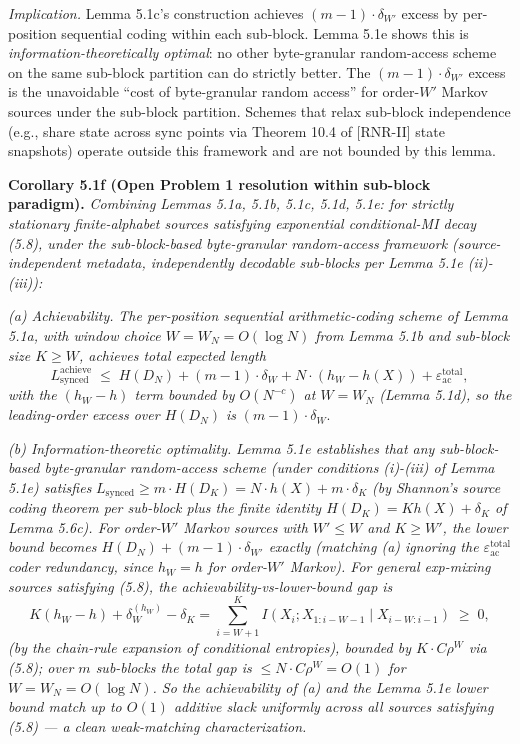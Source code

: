 \documentclass[
]{article}
\begin{document}
\emph{Implication.} Lemma 5.1c's construction achieves
$(m-1) \cdot \delta_{W'}$ excess by per-position sequential coding
within each sub-block. Lemma 5.1e shows this is
\emph{information-theoretically optimal}: no other byte-granular
random-access scheme on the same sub-block partition can do strictly
better. The $(m-1) \cdot \delta_{W'}$ excess is the unavoidable
``cost of byte-granular random access'' for order-$W'$ Markov sources
under the sub-block partition. Schemes that relax sub-block
independence (e.g., share state across sync points via Theorem 10.4 of [RNR-II]
state snapshots) operate outside this framework and are not bounded
by this lemma.

\textbf{Corollary 5.1f (Open Problem 1 resolution within sub-block
paradigm).} \emph{Combining Lemmas 5.1a, 5.1b, 5.1c, 5.1d, 5.1e: for
strictly stationary finite-alphabet sources satisfying exponential
conditional-MI decay (5.8), under the sub-block-based byte-granular
random-access framework (source-independent metadata, independently
decodable sub-blocks per Lemma 5.1e (ii)-(iii)):}

\emph{(a) Achievability.} \emph{The per-position sequential
arithmetic-coding scheme of Lemma 5.1a, with window choice
$W = W_N = O(\log N)$ from Lemma 5.1b and sub-block size $K \geq W$,
achieves total expected length}
\[
L_{\mathrm{synced}}^{\mathrm{achieve}} \;\leq\; H(D_N) + (m-1) \cdot \delta_{W} + N \cdot (h_W - h(X)) + \varepsilon_{\mathrm{ac}}^{\mathrm{total}},
\]
\emph{with the $(h_W - h)$ term bounded by $O(N^{-c})$ at $W = W_N$
(Lemma 5.1d), so the leading-order excess over $H(D_N)$ is}
$(m-1) \cdot \delta_W$.

\emph{(b) Information-theoretic optimality.} \emph{Lemma 5.1e
establishes that any sub-block-based byte-granular random-access
scheme (under conditions (i)-(iii) of Lemma 5.1e) satisfies}
$L_{\mathrm{synced}} \geq m \cdot H(D_K) = N \cdot h(X) + m \cdot \delta_K$
\emph{(by Shannon's source coding theorem per sub-block plus the
finite identity $H(D_K) = K h(X) + \delta_K$ of Lemma 5.6c). For
order-$W'$ Markov sources with $W' \leq W$ and $K \geq W'$, the
lower bound becomes $H(D_N) + (m-1) \cdot \delta_{W'}$ exactly
(matching (a) ignoring the $\varepsilon_{\mathrm{ac}}^{\mathrm{total}}$
coder redundancy, since $h_W = h$ for order-$W'$ Markov). For general
exp-mixing sources satisfying (5.8), the achievability-vs-lower-bound
gap is}
\[
K (h_W - h) + \delta_W^{(h_W)} - \delta_K
= \sum_{i=W+1}^K I(X_i; X_{1:i-W-1} \mid X_{i-W:i-1}) \;\geq\; 0,
\]
\emph{(by the chain-rule expansion of conditional entropies), bounded
by $K \cdot C \rho^W$ via (5.8); over $m$ sub-blocks the total gap is
$\leq N \cdot C \rho^W = O(1)$ for $W = W_N = O(\log N)$. So the
achievability of (a) and the Lemma 5.1e lower bound match up to
$O(1)$ additive slack uniformly across all sources satisfying (5.8) ---
a clean weak-matching characterization.}
\end{document}
